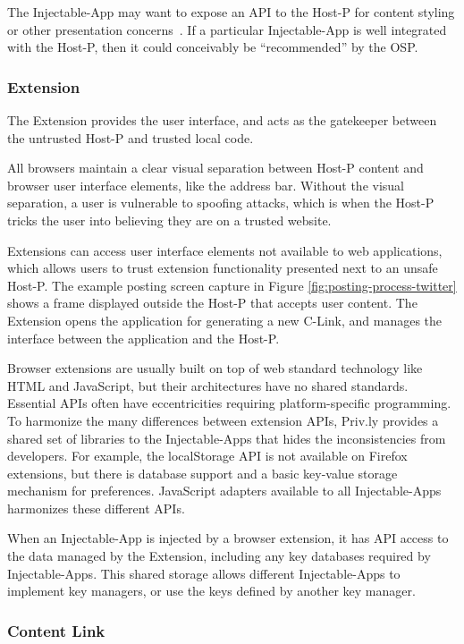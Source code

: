 \documentclass[letterpaper,twocolumn,10pt]{article}
\begin{document}
The Injectable-App may want to expose an API to the Host-P for 
content styling or other presentation concerns~\cite{Barth2009,Jackson2007}. If a 
particular Injectable-App is well integrated with the Host-P, then it could 
conceivably be ``recommended'' by the OSP.

\subsubsection{Extension} \label{sec:privly_extension}

The Extension provides the user interface, and acts as the gatekeeper between the 
untrusted Host-P and trusted local code.

All browsers maintain a clear visual separation between Host-P content and browser 
user interface elements, like the address bar. Without the visual separation, a 
user is vulnerable to spoofing attacks, which is when the Host-P tricks the user 
into believing they are on a trusted website. 

Extensions can access user interface elements not available to web applications, 
which allows users to trust extension functionality presented next to an unsafe 
Host-P. The example posting screen capture in Figure 
\ref{fig:posting-process-twitter} shows a frame displayed outside the Host-P that 
accepts user content. The Extension opens the application for generating a new 
C-Link, and manages the interface between the application and the Host-P.

Browser extensions are usually built on top of web standard technology like
HTML and JavaScript, but their architectures have no shared standards. Essential APIs
often have eccentricities requiring platform-specific programming. To harmonize the
many differences between extension APIs, Priv.ly provides a shared set of 
libraries to the Injectable-Apps that hides the inconsistencies from developers.
For example, the localStorage API is not available on Firefox extensions, but there
is database support and a basic key-value storage mechanism for preferences.
JavaScript adapters available to all Injectable-Apps harmonizes these different
APIs.

When an Injectable-App is injected by a browser extension, it has API access to the
data managed by the Extension, including any key databases required by Injectable-Apps.
This shared storage allows different Injectable-Apps to implement key managers, or use the
keys defined by another key manager.

\subsubsection{Content Link}
\end{document}
